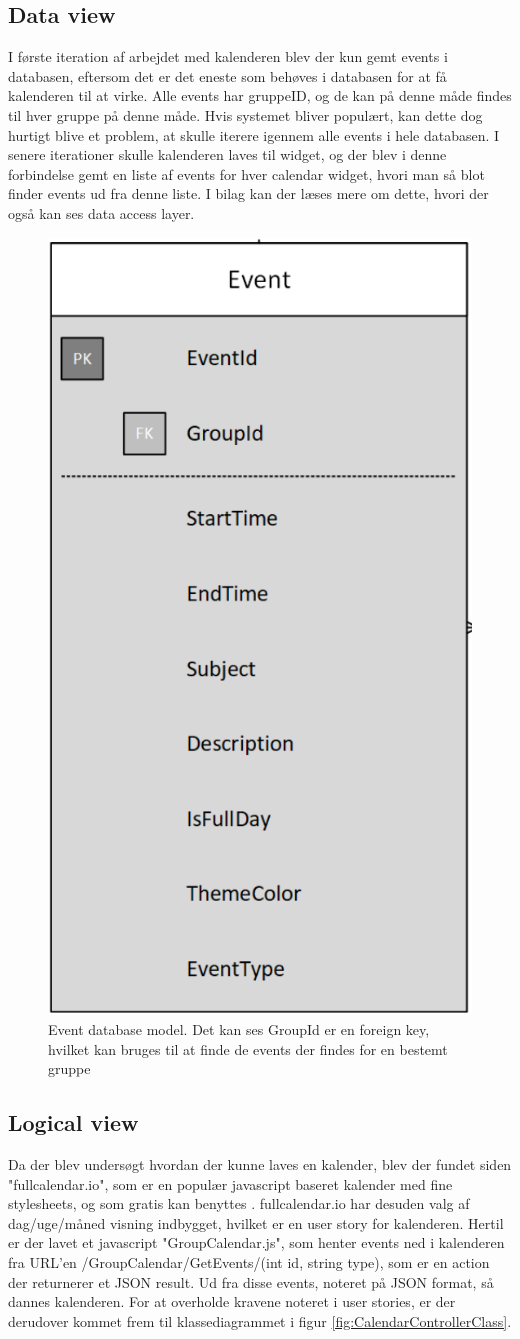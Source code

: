 \subsection{Data view}

I første iteration af arbejdet med kalenderen blev der kun gemt events i databasen, eftersom det er det eneste som behøves i databasen for at få kalenderen til at virke. Alle events har gruppeID, og de kan på denne måde findes til hver gruppe på denne måde. Hvis systemet bliver populært, kan dette dog hurtigt blive et problem, at skulle iterere igennem alle events i hele databasen. I senere iterationer skulle kalenderen laves til widget, og der blev i denne forbindelse gemt en liste af events for hver calendar widget, hvori man så blot finder events ud fra denne liste. I bilag \cite{ArkitekturCalendar} kan der læses mere om dette, hvori der også kan ses data access layer.

\begin{figure}[H]
    \centering
    \includegraphics[width=0.25\linewidth]{09_Arkitektur/Calendar/Images/EventData.png}
    \caption{Event database model. Det kan ses GroupId er en foreign key, hvilket kan bruges til at finde de events der findes for en bestemt gruppe}
    \label{fig:eventDB}
\end{figure}

\subsection{Logical view}

Da der blev undersøgt hvordan der kunne laves en kalender, blev der fundet siden "fullcalendar.io", som er en populær javascript baseret kalender med fine stylesheets, og som gratis kan benyttes \cite{Fullcalendar}. fullcalendar.io har desuden valg af dag/uge/måned visning indbygget, hvilket er en user story for kalenderen. Hertil er der lavet et javascript "GroupCalendar.js", som henter events ned i kalenderen fra URL'en /GroupCalendar/GetEvents/(int id, string type), som er en action der returnerer et JSON result. Ud fra disse events, noteret på JSON format, så dannes kalenderen. 
For at overholde kravene noteret i user stories, er der derudover kommet frem til klassediagrammet i figur \ref{fig:CalendarControllerClass}.

